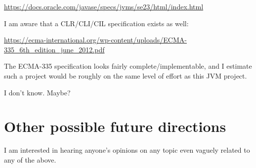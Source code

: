 \documentclass[20pt]{article}
\begin{document}
\href{https://docs.oracle.com/javase/specs/jvms/se23/html/index.html}{https://docs.oracle.com/javase/specs/jvms/se23/html/index.html}

I am aware that a CLR/CLI/CIL specification exists as well:

\href{https://ecma-international.org/wp-content/uploads/ECMA-335_6th_edition_june_2012.pdf}{https://ecma-international.org/wp-content/uploads/ECMA-335\_6th\_edition\_june\_2012.pdf}

The ECMA-335 specification looks fairly complete/implementable, and I estimate
such a project would be roughly on the same level of effort as this JVM project.

I don't know. Maybe?

\section{Other possible future directions}

I am interested in hearing anyone's opinions on any topic even vaguely related
to any of the above.
\end{document}
